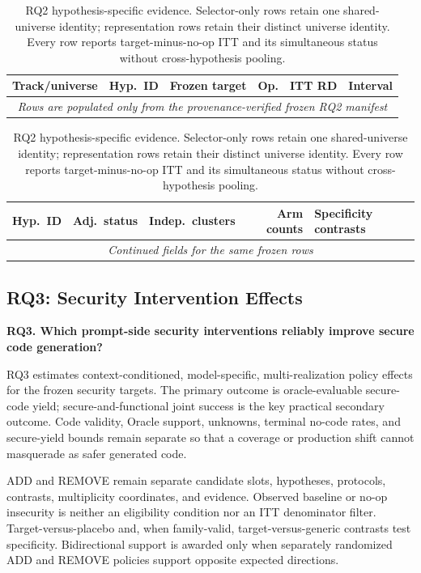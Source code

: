 \documentclass[acmsmall,screen,review,anonymous]{acmart}
\begin{document}
\begin{table}[H]
  \centering
  \small
  \caption{RQ2 hypothesis-specific evidence. Selector-only rows retain one
  shared-universe identity; representation rows retain their distinct universe
  identity. Every row reports target-minus-no-op ITT and its simultaneous
  status without cross-hypothesis pooling.}
  \label{tab:rq2-evidence}
  \begin{tabular}{llllrr}
    \toprule
    Track/universe & Hyp.\ ID & Frozen target & Op. & ITT RD & Interval \\
    \midrule
    \multicolumn{6}{c}{\emph{Rows are populated only from the
    provenance-verified frozen RQ2 manifest}} \\
    \bottomrule
  \end{tabular}

  \medskip
  \begin{tabular}{llrrl}
    \toprule
    Hyp.\ ID & Adj.\ status & Indep.\ clusters & Arm counts & Specificity contrasts \\
    \midrule
    \multicolumn{5}{c}{\emph{Continued fields for the same frozen rows}} \\
    \bottomrule
  \end{tabular}
\end{table}

\subsection{RQ3: Security Intervention Effects}

\textbf{RQ3. Which prompt-side security interventions reliably improve secure
code generation?}

RQ3 estimates context-conditioned, model-specific, multi-realization policy
effects for the frozen security targets. The primary outcome is
oracle-evaluable secure-code yield; secure-and-functional joint success is the
key practical secondary outcome. Code validity, Oracle support, unknowns,
terminal no-code rates, and secure-yield bounds remain separate so that a
coverage or production shift cannot masquerade as safer generated code.

ADD and REMOVE remain separate candidate slots, hypotheses, protocols,
contrasts, multiplicity coordinates, and evidence. Observed baseline or no-op
insecurity is neither an eligibility condition nor an ITT denominator filter.
Target-versus-placebo and, when family-valid, target-versus-generic contrasts
test specificity. Bidirectional support is awarded only when separately
randomized ADD and REMOVE policies support opposite expected directions.
\end{document}
